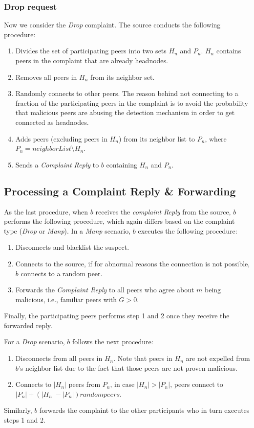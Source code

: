 \subsubsection*{Drop request}
Now we consider the \textit{Drop} complaint. The source conducts the following procedure:
\begin{enumerate}
 \item Divides the set of participating peers into two sets $H_n$ and $P_n$.
 $H_n$ contains peers in the complaint that are already headnodes.
 \item Removes all peers in $H_n$ from its neighbor set.
 \item Randomly connects to other peers. The reason behind not connecting to a fraction of the participating peers in the complaint is to avoid the probability that malicious peers are abusing the detection mechanism in order to get connected as headnodes.
 \item Adds peers (excluding peers in $H_n$) from its neighbor list to $P_n$, where $P_n = neighborList\setminus H_n$.
 \item Sends a \textit{Complaint Reply} to $b$ containing $H_n$ and $P_n$.
\end{enumerate}

\subsection{Processing a Complaint Reply \& Forwarding}

As the last procedure, when $b$ receives the \textit{complaint Reply} from the source, $b$ performs the following procedure, which again differs based on the complaint type (\textit{Drop} or \textit{Manp}).
In a \textit{Manp} scenario, $b$ executes the following procedure:
\begin{enumerate}
 \item Disconnects and blacklist the suspect.
 \item Connects to the source, if for abnormal reasons the connection is not possible, $b$ connects to a random peer.
 \item Forwards the \textit{Complaint Reply} to all peers who agree about $m$ being malicious, i.e., familiar peers with $G > 0$.
\end{enumerate}
Finally, the participating peers performs step 1 and 2 once they receive the forwarded reply.

For a \textit{Drop} scenario, $b$ follows the next procedure:
\begin{enumerate}
 \item Disconnects from all peers in $H_n$. Note that peers in $H_n$ are not expelled from $b$'s neighbor list due to the fact that those peers are not proven malicious.
 \item Connects to $|H_n|$ peers from $P_n$, in case $|H_n|>|P_n|$, peers connect to $|P_n|+(|H_n|-|P_n|)random peers$.
\end{enumerate}
Similarly, $b$ forwards the complaint to the other participants who in turn executes steps 1 and 2.

